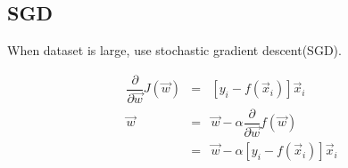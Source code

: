 \subsection{SGD}
When dataset is large, use stochastic gradient descent(SGD).

\begin{eqnarray}
\dfrac{\partial}{\partial \vec{w}}J(\vec{w}) &=& \left[y_i - f(\vec{x}_i) \right]\vec{x}_i \\
\vec{w} &=& \vec{w} - \alpha\dfrac{\partial}{\partial \vec{w}}f(\vec{w}) \nonumber \\
        &=& \vec{w} - \alpha\left[y_i - f(\vec{x}_i) \right]\vec{x}_i
\end{eqnarray}
